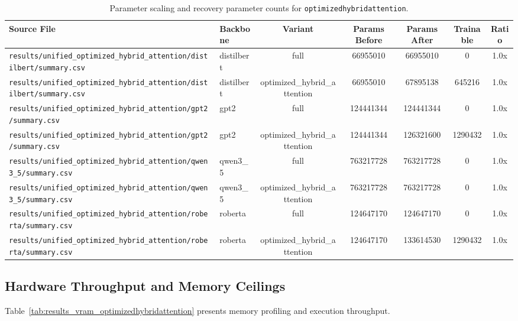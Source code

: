 \begin{table}[t]
\centering
\small
\begin{tabular}{llccccc}
\toprule
\textbf{Source File} & \textbf{Backbone} & \textbf{Variant} & \textbf{Params Before} & \textbf{Params After} & \textbf{Trainable} & \textbf{Ratio} \\
\midrule
\texttt{results/unified\_optimized\_hybrid\_attention/distilbert/summary.csv} & distilbert & full & 66955010 & 66955010 & 0 & 1.0x \\
\texttt{results/unified\_optimized\_hybrid\_attention/distilbert/summary.csv} & distilbert & optimized\_hybrid\_attention & 66955010 & 67895138 & 645216 & 1.0x \\
\texttt{results/unified\_optimized\_hybrid\_attention/gpt2/summary.csv} & gpt2 & full & 124441344 & 124441344 & 0 & 1.0x \\
\texttt{results/unified\_optimized\_hybrid\_attention/gpt2/summary.csv} & gpt2 & optimized\_hybrid\_attention & 124441344 & 126321600 & 1290432 & 1.0x \\
\texttt{results/unified\_optimized\_hybrid\_attention/qwen3\_5/summary.csv} & qwen3\_5 & full & 763217728 & 763217728 & 0 & 1.0x \\
\texttt{results/unified\_optimized\_hybrid\_attention/qwen3\_5/summary.csv} & qwen3\_5 & optimized\_hybrid\_attention & 763217728 & 763217728 & 0 & 1.0x \\
\texttt{results/unified\_optimized\_hybrid\_attention/roberta/summary.csv} & roberta & full & 124647170 & 124647170 & 0 & 1.0x \\
\texttt{results/unified\_optimized\_hybrid\_attention/roberta/summary.csv} & roberta & optimized\_hybrid\_attention & 124647170 & 133614530 & 1290432 & 1.0x \\
\bottomrule
\end{tabular}
\caption{Parameter scaling and recovery parameter counts for \texttt{optimizedhybridattention}.}
\label{tab:results_params_optimizedhybridattention}
\end{table}

\subsection{Hardware Throughput and Memory Ceilings}
Table~\ref{tab:results_vram_optimizedhybridattention} presents memory profiling and execution throughput.

